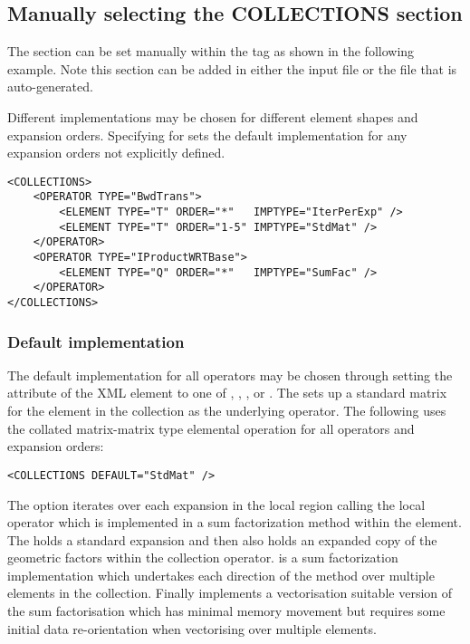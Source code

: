 \subsection{Manually selecting the COLLECTIONS section} 

The  section can be set manually within the
 tag as shown in the following example. Note this
section can be added in either the input  file or
the  file that is auto-generated.

Different implementations may be chosen for different element shapes and
expansion orders.  Specifying \inltt{*} for  sets the
default implementation for any expansion orders not explicitly defined.

\begin{lstlisting}[style=XmlStyle]
<COLLECTIONS>
    <OPERATOR TYPE="BwdTrans">
        <ELEMENT TYPE="T" ORDER="*"   IMPTYPE="IterPerExp" />
        <ELEMENT TYPE="T" ORDER="1-5" IMPTYPE="StdMat" />
    </OPERATOR>
    <OPERATOR TYPE="IProductWRTBase">
        <ELEMENT TYPE="Q" ORDER="*"   IMPTYPE="SumFac" />
    </OPERATOR>
</COLLECTIONS>
\end{lstlisting}

\subsubsection{Default implementation}
The default implementation for all operators may be chosen through
setting the  attribute of the  XML
element to one of , , ,
 or . The  sets up
a standard matrix for the element in the collection as the underlying
operator. The following uses the collated matrix-matrix type elemental
operation for all operators and expansion orders:

\begin{lstlisting}[style=XmlStyle]
<COLLECTIONS DEFAULT="StdMat" />
\end{lstlisting}

The  option iterates over each expansion
in the local region calling the local operator which is implemented in
a sum factorization method within the element. The 
holds a standard expansion and then also holds an expanded copy of the
geometric factors within the collection operator.  is a
sum factorization implementation which undertakes each direction of
the method over multiple elements in the collection. Finally
 implements a vectorisation suitable version of the
sum factorisation which has minimal memory movement but requires some
initial data re-orientation when vectorising over multiple elements. 


